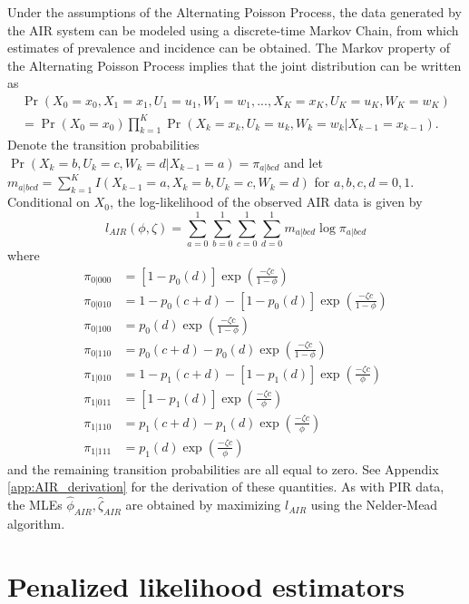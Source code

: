 \documentclass[man, noextraspace, floatsintext]{apa6}\usepackage[]{graphicx}\usepackage[]{color}
\begin{document}
Under the assumptions of the Alternating Poisson Process, the data generated by the AIR system can be modeled using a discrete-time Markov Chain, from which estimates of prevalence and incidence can be obtained. 
The Markov property of the Alternating Poisson Process implies that the joint distribution can be written as
\begin{multline}
\Pr\left(X_0=x_0,X_1=x_1,U_1 = u_1, W_1 = w_1,..., X_K=x_K, U_K = u_K, W_K = w_K \right) \\ = \Pr\left(X_0 = x_0\right) \prod_{k=1}^K \Pr\left(X_k = x_k, U_k = u_k, W_k = w_k | X_{k-1} = x_{k-1}\right). 
\end{multline}
Denote the transition probabilities $\Pr\left(X_k = b, U_k = c, W_k = d | X_{k-1} = a\right) = \pi_{a|bcd}$ and let $m_{a|bcd} = \sum_{k=1}^K I\left(X_{k-1} = a, X_k = b, U_k = c, W_k = d \right)$ for $a,b,c,d = 0,1$. 
Conditional on $X_0$, the log-likelihood of the observed AIR data is given by
\begin{equation}
\label{eq:AIR_loglik}
l_{AIR}\left(\phi,\zeta\right) = \sum_{a=0}^1 \sum_{b=0}^1 \sum_{c=0}^1 \sum_{d=0}^1 m_{a|bcd} \log \pi_{a|bcd}
\end{equation}
where
\begin{align*}
\pi_{0|000} &= \left[1 - p_0(d)\right]\exp\left(\frac{- \zeta c}{1 - \phi}\right) \\
\pi_{0|010} &= 1 - p_0(c + d) - \left[1 - p_0(d)\right]\exp\left(\frac{- \zeta c}{1 - \phi}\right) \\
\pi_{0|100} &= p_0(d)\exp\left(\frac{- \zeta c}{1 - \phi}\right) \\
\pi_{0|110} &= p_0(c + d) - p_0(d) \exp\left(\frac{- \zeta c}{1 - \phi}\right) \\
\pi_{1|010} &= 1 - p_1(c + d) - \left[1 - p_1(d)\right]\exp\left(\frac{- \zeta c}{\phi}\right) \\
\pi_{1|011} &= \left[1 - p_1(d)\right]\exp\left(\frac{- \zeta c}{\phi}\right) \\
\pi_{1|110} &= p_1(c + d) - p_1(d) \exp\left(\frac{- \zeta c}{\phi}\right) \\
\pi_{1|111} &= p_1(d)\exp\left(\frac{- \zeta c}{\phi}\right)
\end{align*}
and the remaining transition probabilities are all equal to zero. 
See Appendix \ref{app:AIR_derivation} for the derivation of these quantities. 
As with PIR data, the MLEs $\hat\phi_{AIR}, \hat\zeta_{AIR}$ are obtained by maximizing $l_{AIR}$ using the Nelder-Mead algorithm. 

\section{Penalized likelihood estimators}
\end{document}
